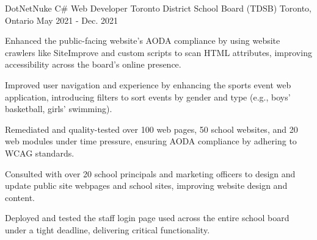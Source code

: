 \begin{cventries}
\cventry
  {DotNetNuke C\# Web Developer} %
  {Toronto District School Board (TDSB)} %
  {Toronto, Ontario} %
  {May 2021 - Dec. 2021} %
  {
    \begin{cvitems} %
      \item {Enhanced the public-facing website's AODA compliance by using website crawlers like SiteImprove and custom scripts to scan HTML attributes, improving accessibility across the board's online presence.}
      \item {Improved user navigation and experience by enhancing the sports event web application, introducing filters to sort events by gender and type (e.g., boys' basketball, girls' swimming).}
      \item {Remediated and quality-tested over 100 web pages, 50 school websites, and 20 web modules under time pressure, ensuring AODA compliance by adhering to WCAG standards.}
      \item {Consulted with over 20 school principals and marketing officers to design and update public site webpages and school sites, improving website design and content.}
      \item {Deployed and tested the staff login page used across the entire school board under a tight deadline, delivering critical functionality.}
    \end{cvitems}
  }



\end{cventries}
